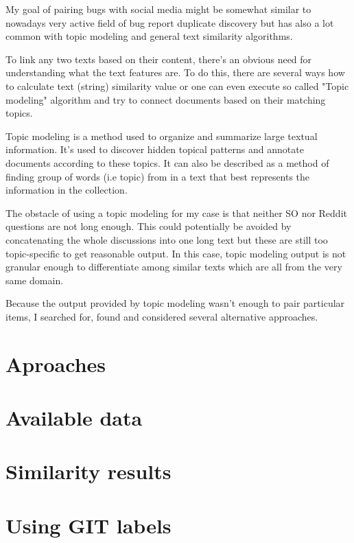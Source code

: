 My goal of pairing bugs with social media might be somewhat similar to nowadays very active field of bug report duplicate discovery but has also a lot common with topic modeling and general text similarity algorithms.

To link any two texts based on their content, there's an obvious need for understanding what the text features are. 
To do this, there are several ways how to calculate text (string) similarity value or one can even execute so called "Topic modeling" algorithm and try to connect documents based on their matching topics.

Topic modeling is a method used to organize and summarize large textual information. It's used to discover hidden topical patterns and annotate documents according to these topics. It can also be described as a method of finding group of words (i.e topic) from in a text that best represents the information in the collection.

The obstacle of using a topic modeling for my case is that neither SO nor Reddit questions are not long enough. This could potentially be avoided by concatenating the whole discussions into one long text but these are still too topic-specific to get reasonable output. In this case, topic modeling output is not granular enough to differentiate among similar texts which are all from the very same domain. 

Because the output provided by topic modeling wasn't enough to pair particular items, I searched for, found and considered several alternative approaches.

\section{Aproaches}


\section{Available data}


\section{Similarity results}


\section{Using GIT labels}

